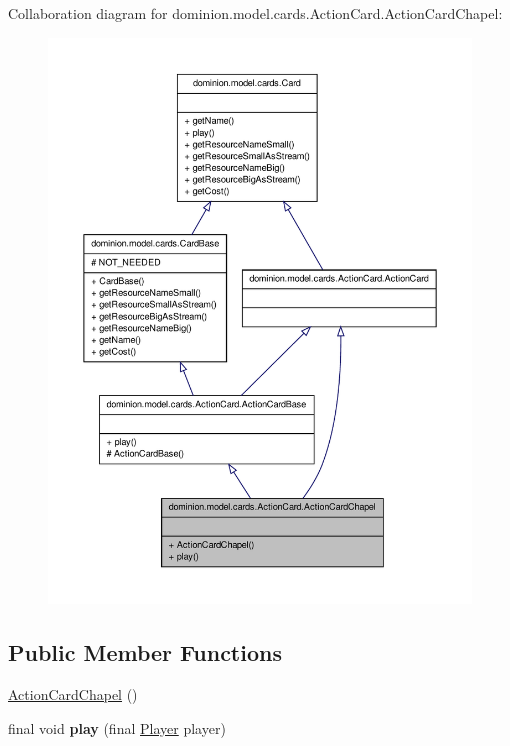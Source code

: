 \-Collaboration diagram for dominion.\-model.\-cards.\-Action\-Card.\-Action\-Card\-Chapel\-:
\nopagebreak
\begin{figure}[H]
\begin{center}
\leavevmode
\includegraphics[width=350pt]{classdominion_1_1model_1_1cards_1_1ActionCard_1_1ActionCardChapel__coll__graph}
\end{center}
\end{figure}
\subsection*{\-Public \-Member \-Functions}
\begin{DoxyCompactItemize}
\item 
\hyperlink{classdominion_1_1model_1_1cards_1_1ActionCard_1_1ActionCardChapel_a95f3a1a192d45ebc077e715dd3886aed}{\-Action\-Card\-Chapel} ()
\item 
\hypertarget{classdominion_1_1model_1_1cards_1_1ActionCard_1_1ActionCardChapel_a1dc38e56ceb2b1163afa488e6059860b}{final void {\bfseries play} (final \hyperlink{interfacedominion_1_1model_1_1Player}{\-Player} player)}\label{classdominion_1_1model_1_1cards_1_1ActionCard_1_1ActionCardChapel_a1dc38e56ceb2b1163afa488e6059860b}

\end{DoxyCompactItemize}


